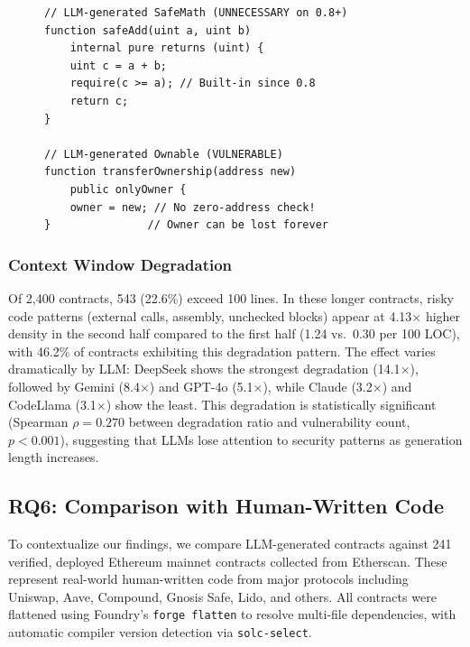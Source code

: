 \begin{figure}[t]
\begin{lstlisting}[caption={Inherited Vulnerability: LLM-generated SafeMath reimplementation on Solidity 0.8+, where built-in overflow checks make it unnecessary and the manual implementation may introduce subtle bugs.}, label={fig:inherited}, language=Solidity, basicstyle=\scriptsize\ttfamily]
// LLM-generated SafeMath (UNNECESSARY on 0.8+)
function safeAdd(uint a, uint b)
    internal pure returns (uint) {
    uint c = a + b;
    require(c >= a); // Built-in since 0.8
    return c;
}

// LLM-generated Ownable (VULNERABLE)
function transferOwnership(address new)
    public onlyOwner {
    owner = new; // No zero-address check!
}               // Owner can be lost forever
\end{lstlisting}
\end{figure}

\subsubsection{Context Window Degradation}
Of 2,400 contracts, 543 (22.6\%) exceed 100 lines. In these longer contracts, risky code patterns (external calls, assembly, unchecked blocks) appear at 4.13$\times$ higher density in the second half compared to the first half (1.24 vs.\ 0.30 per 100 LOC), with 46.2\% of contracts exhibiting this degradation pattern. The effect varies dramatically by LLM: DeepSeek shows the strongest degradation (14.1$\times$), followed by Gemini (8.4$\times$) and GPT-4o (5.1$\times$), while Claude (3.2$\times$) and CodeLlama (3.1$\times$) show the least. This degradation is statistically significant (Spearman $\rho = 0.270$ between degradation ratio and vulnerability count, $p < 0.001$), suggesting that LLMs lose attention to security patterns as generation length increases.

\subsection{RQ6: Comparison with Human-Written Code}

To contextualize our findings, we compare LLM-generated contracts against 241 verified, deployed Ethereum mainnet contracts collected from Etherscan. These represent real-world human-written code from major protocols including Uniswap, Aave, Compound, Gnosis Safe, Lido, and others. All contracts were flattened using Foundry's \texttt{forge flatten} to resolve multi-file dependencies, with automatic compiler version detection via \texttt{solc-select}.

